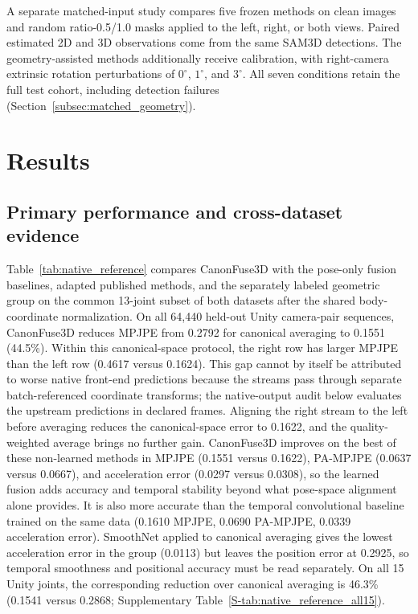 \documentclass[preprint,12pt]{elsarticle}
\begin{document}
A separate matched-input study compares five frozen methods on clean images and random ratio-0.5/1.0 masks applied to the left, right, or both views. Paired estimated 2D and 3D observations come from the same SAM3D detections. The geometry-assisted methods additionally receive calibration, with right-camera extrinsic rotation perturbations of $0^\circ$, $1^\circ$, and $3^\circ$. All seven conditions retain the full test cohort, including detection failures (Section~\ref{subsec:matched_geometry}).

\section{Results}
\label{sec:results}

\subsection{Primary performance and cross-dataset evidence}

Table~\ref{tab:native_reference} compares CanonFuse3D with the pose-only fusion baselines, adapted published methods, and the separately labeled geometric group on the common 13-joint subset of both datasets after the shared body-coordinate normalization. On all 64,440 held-out Unity camera-pair sequences, CanonFuse3D reduces MPJPE from 0.2792 for canonical averaging to 0.1551 (44.5\%). Within this canonical-space protocol, the right row has larger MPJPE than the left row (0.4617 versus 0.1624). This gap cannot by itself be attributed to worse native front-end predictions because the streams pass through separate batch-referenced coordinate transforms; the native-output audit below evaluates the upstream predictions in declared frames. Aligning the right stream to the left before averaging reduces the canonical-space error to 0.1622, and the quality-weighted average brings no further gain. CanonFuse3D improves on the best of these non-learned methods in MPJPE (0.1551 versus 0.1622), PA-MPJPE (0.0637 versus 0.0667), and acceleration error (0.0297 versus 0.0308), so the learned fusion adds accuracy and temporal stability beyond what pose-space alignment alone provides. It is also more accurate than the temporal convolutional baseline trained on the same data (0.1610 MPJPE, 0.0690 PA-MPJPE, 0.0339 acceleration error). SmoothNet applied to canonical averaging gives the lowest acceleration error in the group (0.0113) but leaves the position error at 0.2925, so temporal smoothness and positional accuracy must be read separately. On all 15 Unity joints, the corresponding reduction over canonical averaging is 46.3\% (0.1541 versus 0.2868; Supplementary Table~\ref{S-tab:native_reference_all15}).
\end{document}
